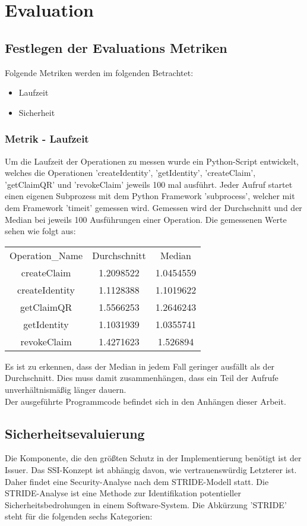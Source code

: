 \chapter{Evaluation}
\label{cha:evaluation}

\section{Festlegen der Evaluations Metriken}
Folgende Metriken werden im folgenden Betrachtet:
\begin{itemize}
	\item Laufzeit
	\item Sicherheit
\end{itemize}
\subsection{Metrik - Laufzeit}
Um die Laufzeit der Operationen zu messen wurde ein Python-Script entwickelt, welches die Operationen 'createIdentity', 'getIdentity', 'createClaim', 'getClaimQR' und 'revokeClaim' jeweils 100 mal ausführt. Jeder Aufruf startet einen eigenen Subprozess mit dem Python Framework 'subprocess', welcher mit dem Framework 'timeit' gemessen wird. Gemessen wird der Durchschnitt und der Median bei jeweils 100 Ausführungen einer Operation. Die gemessenen Werte sehen wie folgt aus:

\begin{center}
	\begin{tabular}{ c c c }
		Operation\_Name 	& Durchschnitt	& Median 		\\
		createClaim 		& 1.2098522 	& 1.0454559 	\\
		createIdentity 		& 1.1128388 	& 1.1019622  	\\
		getClaimQR 			& 1.5566253 	& 1.2646243 	\\
		getIdentity			& 1.1031939 	& 1.0355741 	\\
		revokeClaim 		& 1.4271623 	& 1.526894 		\\
	\end{tabular}
\end{center}
Es ist zu erkennen, dass der Median in jedem Fall geringer ausfällt als der Durchschnitt. Dies muss damit zusammenhängen, dass ein Teil der Aufrufe unverhältnismäßig länger dauern.\\

Der ausgeführte Programmcode befindet sich in den Anhängen dieser Arbeit.	

\section{Sicherheitsevaluierung}
Die Komponente, die den größten Schutz in der Implementierung benötigt ist der Issuer. Das SSI-Konzept ist abhängig davon, wie vertrauenswürdig Letzterer ist. Daher findet eine Security-Analyse nach dem STRIDE-Modell \cite{ID59} statt. Die STRIDE-Analyse ist eine Methode zur Identifikation potentieller Sicherheitsbedrohungen in einem Software-System. Die Abkürzung 'STRIDE' steht für die folgenden sechs Kategorien:

